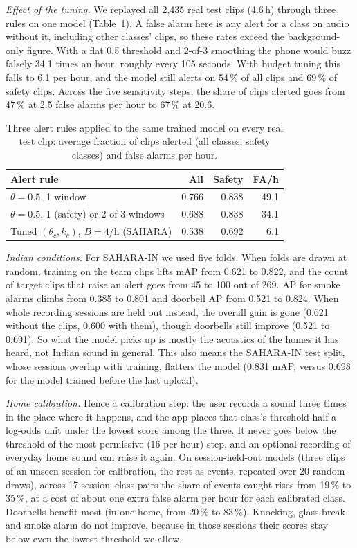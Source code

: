 \documentclass[conference,a4paper]{IEEEtran}
\begin{document}
\textit{Effect of the tuning.} We replayed all 2{,}435 real test clips (4.6\,h) through three rules on one model (Table~\ref{tab:ablation}). A false alarm here is any alert for a class on audio without it, including other classes' clips, so these rates exceed the background-only figure. With a flat 0.5 threshold and 2-of-3 smoothing the phone would buzz falsely 34.1 times an hour, roughly every 105 seconds. With budget tuning this falls to 6.1 per hour, and the model still alerts on 54\,\% of all clips and 69\,\% of safety clips. Across the five sensitivity steps, the share of clips alerted goes from 47\,\% at 2.5 false alarms per hour to 67\,\% at 20.6.

\begin{table}[t]
\caption{Three alert rules applied to the same trained model on every real test clip: average fraction of clips alerted (all classes, safety classes) and false alarms per hour.}
\label{tab:ablation}
\centering\footnotesize
\setlength{\tabcolsep}{3pt}
\begin{tabular}{@{}lrrr@{}}
\toprule
Alert rule & All & Safety & FA/h \\
\midrule
$\theta=0.5$, 1 window & 0.766 & 0.838 & 49.1 \\
$\theta=0.5$, 1 (safety) or 2 of 3 windows & 0.688 & 0.838 & 34.1 \\
Tuned $(\theta_c,k_c)$, $B=4$/h (SAHARA) & 0.538 & 0.692 & 6.1 \\
\bottomrule
\end{tabular}
\end{table}

\textit{Indian conditions.} For SAHARA-IN we used five folds. When folds are drawn at random, training on the team clips lifts mAP from 0.621 to 0.822, and the count of target clips that raise an alert goes from 45 to 100 out of 269. AP for smoke alarms climbs from 0.385 to 0.801 and doorbell AP from 0.521 to 0.824. When whole recording sessions are held out instead, the overall gain is gone (0.621 without the clips, 0.600 with them), though doorbells still improve (0.521 to 0.691). So what the model picks up is mostly the acoustics of the homes it has heard, not Indian sound in general. This also means the SAHARA-IN test split, whose sessions overlap with training, flatters the model (0.831 mAP, versus 0.698 for the model trained before the last upload).

\textit{Home calibration.} Hence a calibration step: the user records a sound three times in the place where it happens, and the app places that class's threshold half a log-odds unit under the lowest score among the three. It never goes below the threshold of the most permissive (16 per hour) step, and an optional recording of everyday home sound can raise it again. On session-held-out models (three clips of an unseen session for calibration, the rest as events, repeated over 20 random draws), across 17 session--class pairs the share of events caught rises from 19\,\% to 35\,\%, at a cost of about one extra false alarm per hour for each calibrated class. Doorbells benefit most (in one home, from 20\,\% to 83\,\%). Knocking, glass break and smoke alarm do not improve, because in those sessions their scores stay below even the lowest threshold we allow.
\end{document}
